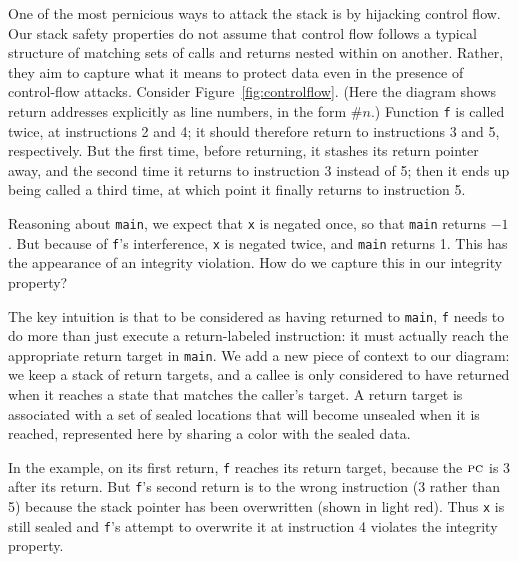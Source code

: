 \documentclass[acmsmall,review,anonymous]{acmart}\settopmatter{printfolios=true,printccs=false,printacmref=false}
\begin{document}
\label{sec:controlflow} %

One of the most pernicious ways to attack the stack is by hijacking control flow.
Our stack safety properties do not assume that control flow follows a typical structure
of matching sets of calls and returns nested within on another.
Rather, they aim to capture what it means to protect data even in the presence of control-flow attacks.
Consider Figure~\ref{fig:controlflow}.
(Here the diagram shows return addresses explicitly as line numbers, in the form $\#n$.)
Function {\tt f} is called twice, at instructions 2 and 4; it should therefore return to instructions
3 and 5, respectively. But the first time, before returning, it stashes its
return pointer away, and the second time it returns to instruction 3 instead of 5; then it ends
up being called a third time, at which point it finally returns to instruction 5.

Reasoning about {\tt main}, we expect that {\tt x} is negated once, so that {\tt main} returns
$-1$. But because of {\tt f}'s interference, {\tt x} is negated twice, and {\tt main} returns 1.
This has the appearance of an integrity violation.  How do we capture this in our
integrity property?

The key intuition is that to be considered as having returned to {\tt main}, {\tt f} needs
to do more than just execute a return-labeled instruction: it must actually reach the
appropriate return target in {\tt main}.
We add a new piece of context to our diagram: we keep a stack of return targets, and a callee is
only considered to have returned when it reaches a state that matches the caller's target.
A return target is associated with a set of sealed locations that will become unsealed
when it is reached, represented here by sharing a color with the sealed data.

In the example, on its first return, {\tt f} reaches its return target, because the
\(\textsc{pc}\) is 3 after its return. But {\tt f}'s second return is to the wrong instruction
(3 rather than 5) because the stack pointer has been overwritten (shown in light red).
Thus {\tt x} is still sealed and {\tt f}'s attempt to overwrite it at instruction 4
violates the integrity property.
\end{document}
